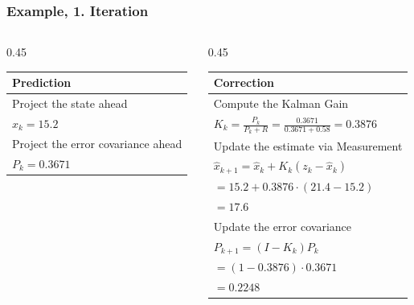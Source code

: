 \documentclass[aspectratio=169]{beamer}
\begin{document}
\begin{frame}
    \frametitle{Example, 1. Iteration}

    \begin{columns}[T]

        \begin{column}{0.45\textwidth}
            \begin{tabular}{ | l |  }
                \hline
                \bf{Prediction}                    \\
                \hline
                \hline
                Project the state ahead            \\
                \(\hat{x}_{k} = 15.2\)             \\
                \hline
                Project the error covariance ahead \\
                \(P_{k} = 0.3671\)                 \\
                \hline
            \end{tabular}
        \end{column}

        \begin{column}{0.45\textwidth}
            \begin{tabular}{ | l |  }
                \hline
                \bf{Correction}                                                         \\
                \hline
                \hline
                Compute the Kalman Gain                                                 \\
                \(K_{k} = \frac{P_{k}}{P_{k}+R} = \frac{0.3671}{0.3671+0.58} = 0.3876\) \\
                \hline
                Update the estimate via Measurement                                     \\
                \(\hat{x}_{k+1} = \hat{x}_{k} + K_{k}(z_{k} - \hat{x}_{k}) \)           \\
                \(= 15.2 + 0.3876 \cdot (21.4 - 15.2) \)                                \\
                \(= 17.6\)                                                              \\
                \hline
                Update the error covariance                                             \\
                \(P_{k+1} = (I - K_{k})P_{k}\)                                          \\
                \(=(1-0.3876)\cdot 0.3671\)                                             \\
                \(= 0.2248\)                                                            \\
                \hline
            \end{tabular}
        \end{column}
    \end{columns}

\end{frame}
\end{document}
